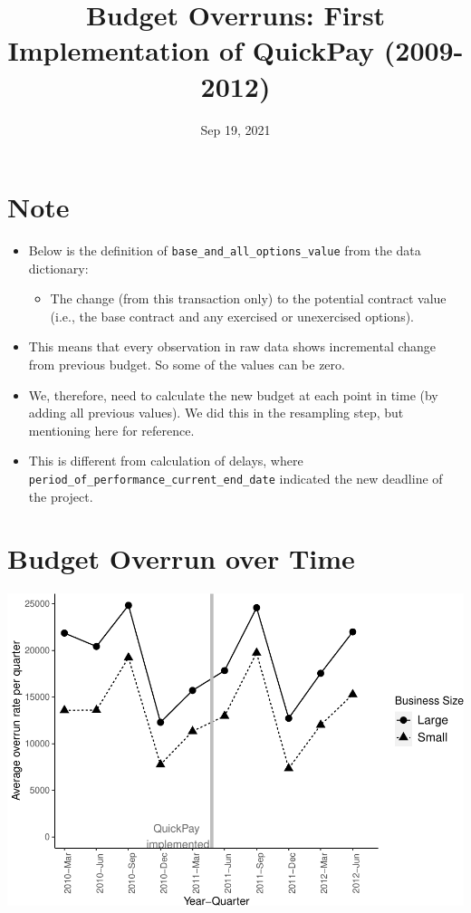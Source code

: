 \documentclass[
]{article}
\title{Budget Overruns: First Implementation of QuickPay (2009-2012)}
\author{}
\date{\vspace{-2.5em}Sep 19, 2021}
\providecommand{\tightlist}{%
  \setlength{\itemsep}{0pt}\setlength{\parskip}{0pt}}
\begin{document}
\maketitle

\hypertarget{note}{%
\section{Note}\label{note}}

\begin{itemize}
\tightlist
\item
  Below is the definition of \texttt{base\_and\_all\_options\_value}
  from the data dictionary:

  \begin{itemize}
  \tightlist
  \item
    The change (from this transaction only) to the potential contract
    value (i.e., the base contract and any exercised or unexercised
    options).
  \end{itemize}
\item
  This means that every observation in raw data shows incremental change
  from previous budget. So some of the values can be zero.
\item
  We, therefore, need to calculate the new budget at each point in time
  (by adding all previous values). We did this in the resampling step,
  but mentioning here for reference.
\item
  This is different from calculation of delays, where
  \texttt{period\_of\_performance\_current\_end\_date} indicated the new
  deadline of the project.
\end{itemize}

\hypertarget{budget-overrun-over-time}{%
\section{Budget Overrun over Time}\label{budget-overrun-over-time}}

\includegraphics{qp_first_budget_overrun_files/figure-latex/plot-1.pdf}
\end{document}
